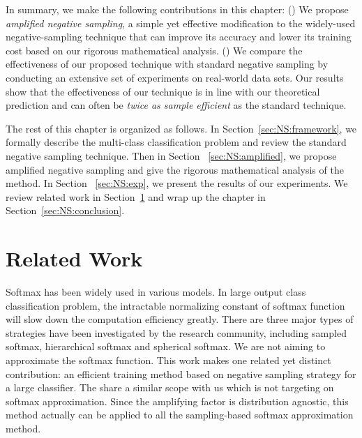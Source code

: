 In summary, we make the following contributions in this chapter:
() We propose \emph{amplified negative sampling}, a simple yet effective modification to the widely-used negative-sampling technique that can improve its accuracy and lower its training cost based on our rigorous mathematical analysis.
 () We compare the effectiveness of our proposed technique with standard negative sampling by conducting an extensive set of experiments on real-world data sets. Our results show that the effectiveness of our technique is in line with our theoretical prediction and can often be \emph{twice as sample efficient} as the standard technique. 


The rest of this chapter is organized as follows. In Section~\ref{sec:NS:framework}, 
we formally describe the multi-class classification problem and review the standard negative sampling technique. Then in Section ~\ref{sec:NS:amplified}, 
we propose amplified negative sampling and give the rigorous mathematical analysis of the method. In Section ~\ref{sec:NS:exp}, 
we present the results of our experiments. We review related work in Section~\ref{sec:NS:related} 
and wrap up the chapter in Section~\ref{sec:NS:conclusion}.

\section{Related Work}
\label{sec:NS:related}
Softmax has been widely used in various models. In large output class classification problem, the intractable normalizing constant of softmax function will slow down the computation efficiency greatly. There are three major types of strategies have been investigated by the research community, including sampled softmax\citep{bengio2008adaptive}, hierarchical softmax\citep{morin2005hierarchical} and spherical softmax\citep{vincent2015efficient}.
We are not aiming to approximate the softmax function. This work makes one related yet distinct contribution: an efficient training method based on negative sampling strategy for a large classifier.  The \citep{ruiz2018augment} share a similar scope with us which is not targeting on softmax approximation. Since the amplifying factor is distribution agnostic, this method actually can be applied to all the sampling-based softmax approximation method\citep{blanc2017adaptive,rawat2019sampled}.

